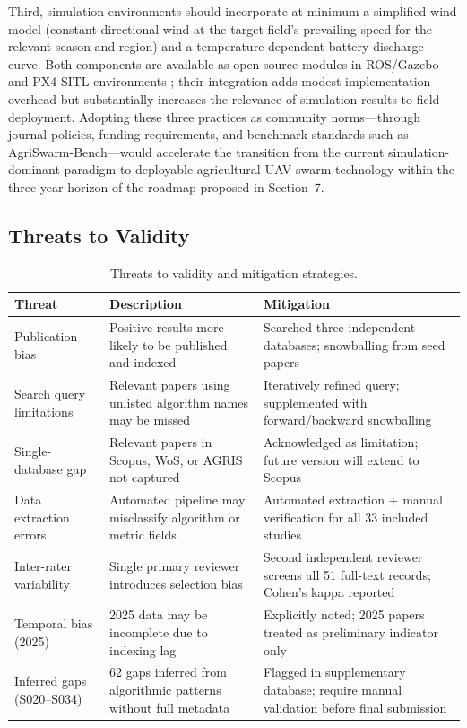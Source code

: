 \documentclass[review,3p,times]{elsarticle}
\begin{document}
Third, simulation environments should incorporate at minimum a simplified wind model (constant directional wind at the target field's prevailing speed for the relevant season and region) and a temperature-dependent battery discharge curve. Both components are available as open-source modules in ROS/Gazebo and PX4 SITL environments \cite{shafiq2022}; their integration adds modest implementation overhead but substantially increases the relevance of simulation results to field deployment. Adopting these three practices as community norms---through journal policies, funding requirements, and benchmark standards such as AgriSwarm-Bench---would accelerate the transition from the current simulation-dominant paradigm to deployable agricultural UAV swarm technology within the three-year horizon of the roadmap proposed in Section~7.

\subsection{Threats to Validity}
\begin{table}[htbp]
\centering
\caption{Threats to validity and mitigation strategies.}
\label{tab:threats}
\begin{tabularx}{\textwidth}{lXX}
\toprule
\textbf{Threat} & \textbf{Description} & \textbf{Mitigation} \\
\midrule
Publication bias & Positive results more likely to be published and indexed & Searched three independent databases; snowballing from seed papers \\
Search query limitations & Relevant papers using unlisted algorithm names may be missed & Iteratively refined query; supplemented with forward/backward snowballing \\
Single-database gap & Relevant papers in Scopus, WoS, or AGRIS not captured & Acknowledged as limitation; future version will extend to Scopus \\
Data extraction errors & Automated pipeline may misclassify algorithm or metric fields & Automated extraction + manual verification for all 33 included studies \\
Inter-rater variability & Single primary reviewer introduces selection bias & Second independent reviewer screens all 51 full-text records; Cohen's kappa reported \\
Temporal bias (2025) & 2025 data may be incomplete due to indexing lag & Explicitly noted; 2025 papers treated as preliminary indicator only \\
Inferred gaps (S020--S034) & 62 gaps inferred from algorithmic patterns without full metadata & Flagged in supplementary database; require manual validation before final submission \\
\bottomrule
\end{tabularx}
\end{table}
\end{document}
